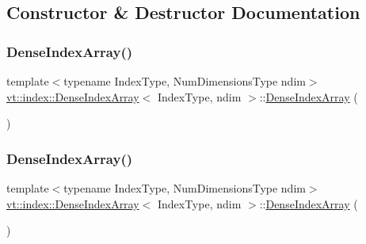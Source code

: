 \subsection{Constructor \& Destructor Documentation}
\mbox{\label{structvt_1_1index_1_1_dense_index_array_afcd3d27f0c86b6c37540ae78f9afc2d1}} 
\subsubsection{\texorpdfstring{Dense\+Index\+Array()}{DenseIndexArray()}\hspace{0.1cm}{\footnotesize\ttfamily [1/6]}}
{\footnotesize\ttfamily template$<$typename Index\+Type, Num\+Dimensions\+Type ndim$>$ \\
\hyperlink{structvt_1_1index_1_1_dense_index_array}{vt\+::index\+::\+Dense\+Index\+Array}$<$ Index\+Type, ndim $>$\+::\hyperlink{structvt_1_1index_1_1_dense_index_array}{Dense\+Index\+Array} (\begin{DoxyParamCaption}{ }\end{DoxyParamCaption})\hspace{0.3cm}{\ttfamily [default]}}

\mbox{\label{structvt_1_1index_1_1_dense_index_array_a835d59e4ac4c01436b7068c2fa05137b}} 
\subsubsection{\texorpdfstring{Dense\+Index\+Array()}{DenseIndexArray()}\hspace{0.1cm}{\footnotesize\ttfamily [2/6]}}
{\footnotesize\ttfamily template$<$typename Index\+Type, Num\+Dimensions\+Type ndim$>$ \\
\hyperlink{structvt_1_1index_1_1_dense_index_array}{vt\+::index\+::\+Dense\+Index\+Array}$<$ Index\+Type, ndim $>$\+::\hyperlink{structvt_1_1index_1_1_dense_index_array}{Dense\+Index\+Array} (\begin{DoxyParamCaption}\item[{\hyperlink{structvt_1_1index_1_1_dense_index_array}{Dense\+Index\+Array}$<$ Index\+Type, ndim $>$ const \&}]{ }\end{DoxyParamCaption})\hspace{0.3cm}{\ttfamily [default]}}

